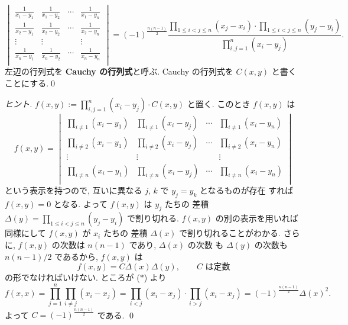 \documentclass[12pt,twoside]{jarticle}
\begin{document}
\begin{question}
  \begin{equation*}
    \begin{vmatrix}
      \frac{1}{x_1-y_1} & \frac{1}{x_1-y_2} & \cdots & \frac{1}{x_1-y_n} \\
      \frac{1}{x_2-y_1} & \frac{1}{x_2-y_2} & \cdots & \frac{1}{x_2-y_n} \\
      \vdots            & \vdots            &        & \vdots \\
      \frac{1}{x_n-y_1} & \frac{1}{x_n-y_2} & \cdots & \frac{1}{x_n-y_n} \\
    \end{vmatrix}
    = (-1)^{\frac{n(n-1)}{2}} \frac
    {\prod_{1\le i<j\le n}(x_j-x_i)\cdot \prod_{1\le i<j\le n}(y_j-y_i)}
    {\prod_{i,j=1}^n (x_i-y_j)}.
  \end{equation*}
  左辺の行列式を {\bf Cauchy の行列式}と呼ぶ.
  Cauchy の行列式を $C(x,y)$ と書くことにする.\qed
\end{question}

\begin{proof}[ヒント]
  $f(x,y):=\prod_{i,j=1}^n(x_i-y_j)\cdot C(x,y)$ と置く.  
  このとき $f(x,y)$ は
  \begin{equation*}
    f(x,y) = 
    \begin{vmatrix}
      \prod_{i\ne 1}(x_i-y_1) & \prod_{i\ne 1}(x_i-y_j) & \cdots & \prod_{i\ne 1}(x_i-y_n) \\
      \prod_{i\ne 2}(x_i-y_1) & \prod_{i\ne 2}(x_i-y_j) & \cdots & \prod_{i\ne 2}(x_i-y_n) \\
      \vdots                  & \vdots                  &        & \vdots                  \\
      \prod_{i\ne n}(x_i-y_1) & \prod_{i\ne n}(x_i-y_j) & \cdots & \prod_{i\ne n}(x_i-y_n) \\
    \end{vmatrix}
    \tag{$*$}
  \end{equation*}
  という表示を持つので, 互いに異なる $j$, $k$ で $y_j=y_k$ となるものが存在
  すれば $f(x,y)=0$ となる.  よって $f(x,y)$ は $y_j$ たちの
  差積 $\Delta(y)=\prod_{1\le i<j\le n} (y_j - y_i)$ で割り切れる.
  $f(x,y)$ の別の表示を用いれば同様にして $f(x,y)$ が $x_i$ たちの
  差積 $\Delta(x)$ で割り切れることがわかる. 
  さらに, $f(x,y)$ の次数は $n(n-1)$ であり, $\Delta(x)$ の次数
  も $\Delta(y)$ の次数も $n(n-1)/2$ であるから, $f(x,y)$ は
  \begin{equation*}
    f(x,y) = C \Delta(x)\Delta(y), \qquad \text{$C$ は定数}
  \end{equation*}
  の形でなければいけない.  ところが ($*$) より
  \begin{equation*}
    f(x,x) 
    = \prod_{j=1}^n\prod_{i\ne j}(x_i-x_j)
    = \prod_{i<j}(x_i-x_j)\cdot\prod_{i>j}(x_i-x_j)
    = (-1)^{\frac{n(n-1)}{2}}\Delta(x)^2.
  \end{equation*}
  よって $C=(-1)^{\frac{n(n-1)}{2}}$ である. \qed
\end{proof}
\end{document}
